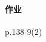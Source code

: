 \documentclass[hidelinks]{ctexart}
\begin{document}
\paragraph{作业} %
\label{par:作业}

p.138 9(2)



\end{document}
